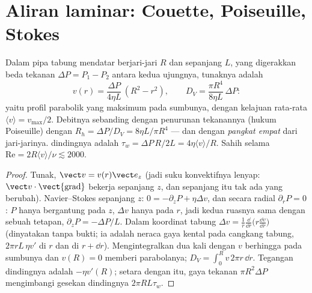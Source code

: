 \section{Aliran laminar: Couette, Poiseuille, Stokes}

\begin{proposition}\label{prop:b2:viscous-flows:poiseuille}
Dalam pipa tabung mendatar berjari-jari $R$ dan sepanjang $L$, yang
digerakkan beda tekanan $\Delta P = P_1 - P_2$ antara kedua ujungnya,  tunaknya adalah
\[
v(r) = \frac{\Delta P}{4\eta L}\,(R^2 - r^2) , \qquad
D_V = \frac{\pi R^4}{8\eta L}\,\Delta P :
\]
yaitu profil parabolik yang maksimum pada sumbunya, dengan kelajuan rata-rata
$\langle v\rangle = v_{\max}/2$. Debitnya sebanding dengan
penurunan tekanannya (hukum Poiseuille) dengan \emph{}
$R_h = \Delta P/D_V = 8\eta L/\pi R^4$ --- dan dengan \emph{pangkat empat} dari
jari-jarinya.  dindingnya adalah $\tau_w = \Delta P\,R/2L = 4\eta\langle v
\rangle/R$. Sahih selama $\mathrm{Re} = 2R\langle v\rangle/\nu \lesssim 2000$.
\end{proposition}

\begin{proof}
Tunak, $\vect v = v(r)\vect e_z$ (jadi suku konvektifnya lenyap: $\vect v
\cdot\operatorname{\vect{grad}}$ bekerja sepanjang $z$, dan sepanjang itu tak ada yang
berubah). Navier--Stokes sepanjang $z$: $0 = -\partial_zP + \eta\Delta v$, dan
secara radial $\partial_rP = 0$: $P$ hanya bergantung pada $z$, $\Delta v$ hanya pada $r$, jadi
kedua ruasnya sama dengan sebuah tetapan, $\partial_zP = -\Delta P/L$. Dalam koordinat
tabung $\Delta v = \frac1r\frac{\dd}{\dd r}\bigl(r\frac{\dd v}{\dd r}\bigr)$
(dinyatakan tanpa bukti; ia adalah neraca gaya kental pada cangkang tabung,
$2\pi rL\,\eta v'$ di $r$ dan di $r + \dd r$). Mengintegralkan dua kali dengan $v$
berhingga pada sumbunya dan $v(R) = 0$ memberi parabolanya; $D_V = \int_0^Rv\,2\pi
r\,\dd r$. Tegangan dindingnya adalah $-\eta v'(R)$; setara dengan itu, gaya
tekanan $\pi R^2\Delta P$ mengimbangi gesekan dindingnya $2\pi RL\tau_w$.
\end{proof}

